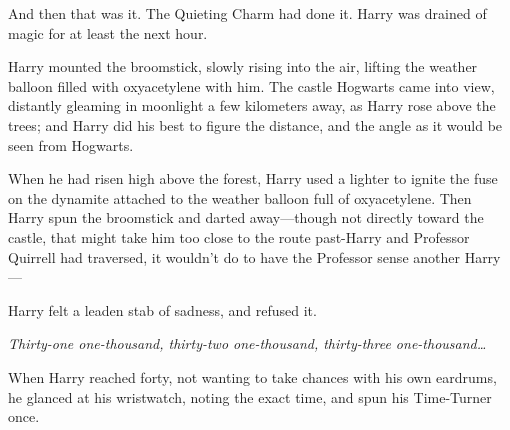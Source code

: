 And then that was it. The Quieting Charm had done it. Harry was drained of magic for at least the next hour.

Harry mounted the broomstick, slowly rising into the air, lifting the weather balloon filled with oxyacetylene with him. The castle Hogwarts came into view, distantly gleaming in moonlight a few kilometers away, as Harry rose above the trees; and Harry did his best to figure the distance, and the angle as it would be seen from Hogwarts.

When he had risen high above the forest, Harry used a lighter to ignite the fuse on the dynamite attached to the weather balloon full of oxyacetylene. Then Harry spun the broomstick and darted away—though not directly toward the castle, that might take him too close to the route past-Harry and Professor Quirrell had traversed, it wouldn't do to have the Professor sense another Harry—

Harry felt a leaden stab of sadness, and refused it.

\emph{Thirty-one one-thousand, thirty-two one-thousand, thirty-three one\hyp{}thousand{\ldots}}

When Harry reached forty, not wanting to take chances with his own eardrums, he glanced at his wristwatch, noting the exact time, and spun his Time-Turner once.

